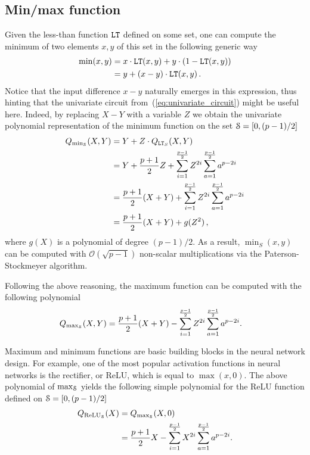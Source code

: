 \subsection{Min/max function}

  Given the less-than function $\LT$ defined on some set, one can compute the minimum of two elements $x, y$ of this set in the following generic way
  \begin{align*}
    \min(x,y) &= x \cdot \LT(x,y) + y \cdot (1 - \LT(x,y)) \\
    &= y + (x-y) \cdot \LT(x,y)\,.
  \end{align*}
  Notice that the input difference $x - y$ naturally emerges in this expression, thus hinting that the univariate circuit from~(\ref{eq:univariate_circuit}) might be useful here.
  Indeed, by replacing $X - Y$ with a variable $Z$ we obtain the univariate polynomial representation of the minimum function on the set $\S=[0,(p-1)/2]$ 
  \begin{align*}
    Q_{\min_\S}(X,Y) &= Y + Z \cdot Q_{\LT_S}(X,Y) \\
    & = Y + \frac{p+1}{2} Z + \sum_{i=1}^{\frac{p-1}{2}} Z^{2i} \sum_{a=1}^{\frac{p-1}{2}} a^{p-2i} \\
    & = \frac{p+1}{2} (X+Y) + \sum_{i=1}^{\frac{p-1}{2}} Z^{2i} \sum_{a=1}^{\frac{p-1}{2}} a^{p-2i} \\
    & = \frac{p+1}{2} (X+Y) + g(Z^2)\,,
  \end{align*}
  where $g(X)$ is a polynomial of degree $(p-1)/2$. 
  As a result, $\min_S(x,y)$ can be computed with $\mathcal{O}(\sqrt{p-1})$ non-scalar multiplications via the Paterson-Stockmeyer algorithm.

  Following the above reasoning, the maximum function can be computed with the following polynomial
  \begin{align*}
    Q_{\max_\S}(X,Y) &= \frac{p+1}{2} (X+Y) - \sum_{i=1}^{\frac{p-1}{2}} Z^{2i} \sum_{a=1}^{\frac{p-1}{2}} a^{p-2i}.
  \end{align*}
  \begin{remark}
    Maximum and minimum functions are basic building blocks in the neural network design.
    For example, one of the most popular activation functions in neural networks is the rectifier, or ReLU, which is equal to $\max(x,0)$.
    The above polynomial of $\max_\S$ yields the following simple polynomial for the ReLU function defined on $\S=[0,(p-1)/2]$
    \begin{align*}
      Q_{\ReLU_\S}(X) &= Q_{\max_\S}(X,0) \\
      &= \frac{p+1}{2} X - \sum_{i=1}^{\frac{p-1}{2}} X^{2i} \sum_{a=1}^{\frac{p-1}{2}} a^{p-2i}.
    \end{align*}
  \end{remark}

